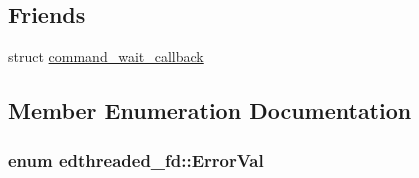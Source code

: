 \subsection*{Friends}
\begin{DoxyCompactItemize}
\item 
struct \hyperlink{classedthreaded__fd_a51b319f0e7d155dc96111998cbf641e2}{command\-\_\-wait\-\_\-callback}
\end{DoxyCompactItemize}


\subsection{Member Enumeration Documentation}
\hypertarget{classedthreaded__fd_ab3562872429271887a15489b7a1a17d7}{
\subsubsection[{Error\-Val}]{\setlength{\rightskip}{0pt plus 5cm}enum {\bf edthreaded\-\_\-fd\-::\-Error\-Val}}}\label{classedthreaded__fd_ab3562872429271887a15489b7a1a17d7}
